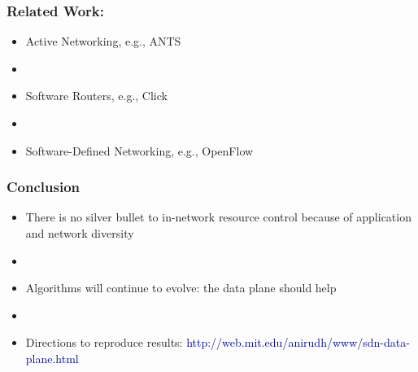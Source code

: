 \begin{Large}
\begin{frame}[plain]
\frametitle{Related Work:}
\begin{itemize}
\item Active Networking, e.g., ANTS
\item []
\item Software Routers, e.g., Click
\item []
\item Software-Defined Networking, e.g., OpenFlow
\end{itemize}
\end{frame}

\begin{frame}[plain]

\frametitle{Conclusion}
\begin{itemize}

\item There is no silver bullet to in-network resource control because
  of application and network diversity

\item[]
\item Algorithms will continue to evolve: the data plane should help

\item[]
\item Directions to reproduce results: \textcolor{DarkBlue}{http://web.mit.edu/anirudh/www/sdn-data-plane.html} 

\end{itemize}
\end{frame}



\end{Large}

